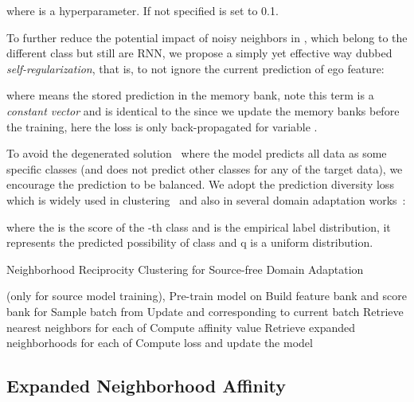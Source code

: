 \documentclass{article}
\begin{document}
where  is a hyperparameter. If not specified  is set to 0.1. 


To further reduce the potential impact of noisy neighbors in , which belong to the different class but still are RNN, we propose a simply yet effective way dubbed \textit{self-regularization}, that is, to not ignore the current prediction of ego feature:

where  means the stored prediction in the memory bank, note this term is a \textit{constant vector} and is identical to the  since we update the memory banks before the training, {here the loss is only back-propagated for variable .}



To avoid the degenerated solution~\cite{ghasedi2017deep,shi2012information} where the model predicts all data as some specific classes (and does not predict other classes for any of the target data), we encourage the prediction to be balanced. We adopt the prediction diversity loss which is widely used in clustering~\cite{ghasedi2017deep,gomes2010discriminative,jabi2019deep} and also in several domain adaptation works~\cite{liang2020we,shi2012information,tang2020unsupervised}:

where the  is the score of the -th class and  is the empirical label distribution, it represents the predicted possibility of class  and q is a uniform distribution.

{\small
\begin{algorithm}[t]
 	\footnotesize
	\caption{Neighborhood Reciprocity Clustering for Source-free Domain Adaptation}
	\label{alg:snr}
	\begin{algorithmic}[1]
		\Require  (only for source model training),  \State Pre-train model on 
		\State Build feature bank  and score bank  for 
		\State Sample batch  from  
		\State Update  and  corresponding to current batch 
		\State Retrieve nearest neighbors  for each of 
		\State Compute affinity value  
		\State Retrieve expanded neighborhoods  for each of  
		\State Compute loss and update the model
\EndWhile 
	\end{algorithmic}
\end{algorithm}}
\vspace{-2mm}

\subsection{Expanded Neighborhood Affinity}\label{sec:expand}
\end{document}
